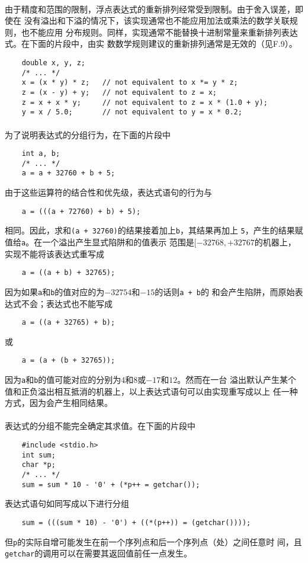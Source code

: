 \paragraph{}
\ex 由于精度和范围的限制，浮点表达式的重新排列经常受到限制。由于舍入误差，即使在
没有溢出和下溢的情况下，该实现通常也不能应用加法或乘法的数学关联规则，也不能应用
分布规则。同样，实现通常不能替换十进制常量来重新排列表达式。在下面的片段中，由实
数数学规则建议的重新排列通常是无效的（见F.9）。
\begin{lstlisting}
    double x, y, z;
    /* ... */
    x = (x * y) * z;   // not equivalent to x *= y * z;
    z = (x - y) + y;   // not equivalent to z = x;
    z = x + x * y;     // not equivalent to z = x * (1.0 + y);
    y = x / 5.0;       // not equivalent to y = x * 0.2;
\end{lstlisting}

\paragraph{}
\ex 为了说明表达式的分组行为，在下面的片段中
\begin{lstlisting}
    int a, b;
    /* ... */
    a = a + 32760 + b + 5;
\end{lstlisting}
由于这些运算符的结合性和优先级，表达式语句的行为与
\begin{lstlisting}
    a = (((a + 72760) + b) + 5);
\end{lstlisting}
相同。因此，求和\texttt{(a + 32760)}的结果接着加上\texttt{b}，其结果再加上
\texttt{5}，产生的结果赋值给\texttt{a}。在一个溢出产生显式陷阱和的值表示
范围是$[-32768, +32767$的机器上，实现不能将该表达式重写成
\begin{lstlisting}
    a = ((a + b) + 32765);
\end{lstlisting}
因为如果\texttt{a}和\texttt{b}的值对应的为$-32754$和$-15$的话则\texttt{a + b}的
和会产生陷阱，而原始表达式不会；表达式也不能写成
\begin{lstlisting}
    a = ((a + 32765) + b);
\end{lstlisting}
或
\begin{lstlisting}
    a = (a + (b + 32765));
\end{lstlisting}
因为\texttt{a}和\texttt{b}的值可能对应的分别为$4$和$8$或$-17$和$12$。然而在一台
溢出默认产生某个值和正负溢出相互抵消的机器上，以上表达式语句可以由实现重写成以上
任一种方式，因为会产生相同结果。

\paragraph{}
\ex 表达式的分组不能完全确定其求值。在下面的片段中
\begin{lstlisting}
    #include <stdio.h>
    int sum;
    char *p;
    /* ... */
    sum = sum * 10 - '0' + (*p++ = getchar());
\end{lstlisting}
表达式语句如同写成以下进行分组
\begin{lstlisting}
    sum = (((sum * 10) - '0') + ((*(p++)) = (getchar())));
\end{lstlisting}
但\texttt{p}的实际自增可能发生在前一个序列点和后一个序列点（\tm{;}处）之间任意时
间，且\texttt{getchar}的调用可以在需要其返回值前任一点发生。

